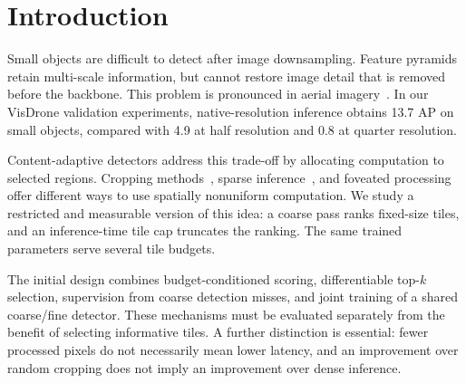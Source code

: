 \documentclass[conference]{IEEEtran}
\begin{document}
\section{Introduction}
Small objects are difficult to detect after image downsampling. Feature pyramids~\cite{lin2017fpn} retain multi-scale information, but cannot restore image detail that is removed before the backbone. This problem is pronounced in aerial imagery~\cite{cheng2023sodsurvey,zhu2022visdrone}. In our VisDrone validation experiments, native-resolution inference obtains 13.7 AP on small objects, compared with 4.9 at half resolution and 0.8 at quarter resolution.

Content-adaptive detectors address this trade-off by allocating computation to selected regions. Cropping methods~\cite{yang2019clusdet,li2020dmnet,deng2021glsan,huang2022ufpmp,koyun2022focusdetect,liu2024yolc}, sparse inference~\cite{yang2022querydet,du2023ceasc,liu2025esod}, and foveated processing~\cite{thavamani2021fovea,thavamani2023lzu} offer different ways to use spatially nonuniform computation. We study a restricted and measurable version of this idea: a coarse pass ranks fixed-size tiles, and an inference-time tile cap truncates the ranking. The same trained parameters serve several tile budgets.

The initial design combines budget-conditioned scoring, differentiable top-$k$ selection, supervision from coarse detection misses, and joint training of a shared coarse/fine detector. These mechanisms must be evaluated separately from the benefit of selecting informative tiles. A further distinction is essential: fewer processed pixels do not necessarily mean lower latency, and an improvement over random cropping does not imply an improvement over dense inference.
\end{document}
